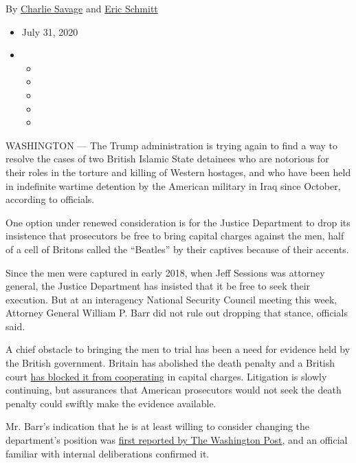 By \href{https://www.nytimes3xbfgragh.onion/by/charlie-savage}{Charlie
Savage} and
\href{https://www.nytimes3xbfgragh.onion/by/eric-schmitt}{Eric Schmitt}

\begin{itemize}
\item
  July 31, 2020
\item
  \begin{itemize}
  \item
  \item
  \item
  \item
  \item
  \end{itemize}
\end{itemize}

WASHINGTON --- The Trump administration is trying again to find a way to
resolve the cases of two British Islamic State detainees who are
notorious for their roles in the torture and killing of Western
hostages, and who have been held in indefinite wartime detention by the
American military in Iraq since October, according to officials.

One option under renewed consideration is for the Justice Department to
drop its insistence that prosecutors be free to bring capital charges
against the men, half of a cell of Britons called the ``Beatles'' by
their captives because of their accents.

Since the men were captured in early 2018, when Jeff Sessions was
attorney general, the Justice Department has insisted that it be free to
seek their execution. But at an interagency National Security Council
meeting this week, Attorney General William P. Barr did not rule out
dropping that stance, officials said.

A chief obstacle to bringing the men to trial has been a need for
evidence held by the British government. Britain has abolished the death
penalty and a British court
\href{https://www.nytimes3xbfgragh.onion/2020/03/25/us/isis-beatles-death-penalty.html}{has
blocked it from cooperating} in capital charges. Litigation is slowly
continuing, but assurances that American prosecutors would not seek the
death penalty could swiftly make the evidence available.

Mr. Barr's indication that he is at least willing to consider changing
the department's position was
\href{https://www.washingtonpost.com/national-security/ag-barr-willing-to-consider-forgoing-death-penalty-to-secure-prosecution-of-isis-detainees-allegedly-involved-in-beheadings-of-american-hostages/2020/07/31/71e475f0-cdd4-11ea-91f1-28aca4d833a0_story.html?hpid=hp_hp-more-top-stories_hostages-205pm\%3Ahomepage\%2Fstory-ans}{first
reported by The Washington Post}, and an official familiar with internal
deliberations confirmed it.

